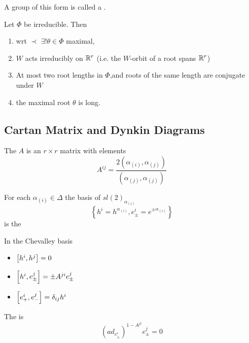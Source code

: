 \documentclass{article}
\begin{document}
\begin{remark}
	A group of this form is called a .
\end{remark}

\begin{prop}
	Let $\Phi$ be irreducible. Then
	\begin{enumerate}
		\item wrt $\prec$ $\exists! \theta \in \Phi$ maximal,
		\item $W$ acts irreducibly on $\mbb{R}^r$ (i.e. the $W$-orbit of a root spans $\mbb{R}^r$)
		\item At most two root lengths in $\Phi$,and roots of the same length are conjugate under $W$
		\item the maximal root $\theta$ is long. 
	\end{enumerate}
\end{prop}


\subsection{Cartan Matrix and Dynkin Diagrams}

\begin{definition}
	The  $A$ is an $r \times r$ matrix with elements 
	\[
	A^{ij}=\frac{2(\alpha_{(i)},\alpha_{(j)})}{(\alpha_{(j)},\alpha_{(j)})}
	\]
\end{definition}

\begin{definition}
	For each $\alpha_{(i)}\in\Delta$ the basis of $sl(2)_{\alpha_{(i)}}$
	\[
	\left\{ h^i=h^{\alpha_{(i)}}, e^i_\pm=e^{\pm\alpha_{(i)}} \right\}
	\]
	is the 
\end{definition}

\begin{theorem}
	In the Chevalley basis
	\begin{itemize}
		\item $\comm[h^i]{h^j}=0$
		\item $\comm[h^i]{e^j_\pm}=\pm A^{ji} e^j_\pm$
		\item $\comm[e^i_+]{e^j_-}=\delta_{ij} h^i$
	\end{itemize}
\end{theorem}

\begin{theorem}
	The  is 
	\[
	\left( ad_{e^i_\pm}\right)^{1-A^{ji}} e^j_\pm=0
	\]
\end{theorem}
\end{document}
